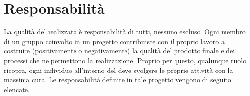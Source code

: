 \documentclass[a4paper, titlepage]{article}
\begin{document}
	\section{Responsabilità} 
	\label{sec:repo}
	La qualità del  realizzato è responsabilità di tutti, nessuno escluso. Ogni membro di un gruppo coinvolto in un progetto  contribuisce con il proprio lavoro a costruire (positivamente o negativamente) la qualità del prodotto finale e dei processi che ne permettono la realizzazione.
	\newline Proprio per questo, qualunque ruolo ricopra, ogni individuo all'interno del  deve svolgere le proprie attività con la massima cura.
	\newline Le responsabilità definite in tale progetto vengono di seguito elencate.
	\begin{description}
		

\end{description}
\end{document}
